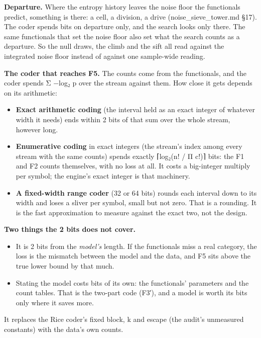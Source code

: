 \textbf{Departure.} Where the entropy history leaves the noise floor the functionals predict, something is there: a cell, a division, a drive (noise\_\allowbreak{}sieve\_\allowbreak{}tower.md §17). The coder spends bits on departure only, and the search looks only there. The same functionals that set the noise floor also set what the search counts as a departure. So the null draws, the climb and the sift all read against the integrated noise floor instead of against one sample-wide reading.

\textbf{The coder that reaches F5.} The counts come from the functionals, and the coder spends Σ −log₂ p over the stream against them. How close it gets depends on its arithmetic:

\begin{itemize}
\item \textbf{Exact arithmetic coding} (the interval held as an exact integer of whatever width it needs) ends within 2 bits of that sum over the whole stream, however long.
\item \textbf{Enumerative coding} in exact integers (the stream's index among every stream with the same counts) spends exactly ⌈log₂(n! / Π c!)⌉ bits: the F1 and F2 counts themselves, with no loss at all. It costs a big-integer multiply per symbol; the engine's exact integer is that machinery.
\item \textbf{A fixed-width range coder} (32 or 64 bits) rounds each interval down to its width and loses a sliver per symbol, small but not zero. That is a rounding. It is the fast approximation to measure against the exact two, not the design.
\end{itemize}

\textbf{Two things the 2 bits does not cover.}

\begin{itemize}
\item It is 2 bits from the \emph{model's} length. If the functionals miss a real category, the loss is the mismatch between the model and the data, and F5 sits above the true lower bound by that much.
\item Stating the model costs bits of its own: the functionals' parameters and the count tables. That is the two-part code (F3′), and a model is worth its bits only where it saves more.
\end{itemize}

It replaces the Rice coder's fixed block, k and escape (the audit's unmeasured constants) with the data's own counts.

